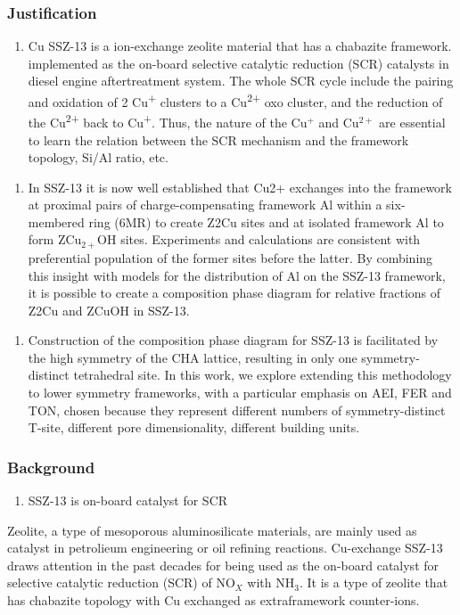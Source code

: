\documentclass[12pt]{article}
\begin{document}
\subsubsection*{Justification}
\begin{enumerate}
\item Cu SSZ-13 is a ion-exchange zeolite material that has a chabazite framework. implemented as the on-board selective catalytic reduction (SCR) catalysts in diesel engine aftertreatment system. The whole SCR cycle include the pairing and oxidation of 2 Cu\textsuperscript{+} clusters to a Cu\textsuperscript{2+} oxo cluster, and the reduction of the Cu\textsuperscript{2+} back to Cu\textsuperscript{+}. Thus, the nature of the Cu$^{+}$ and Cu$^{2+}$ are essential to learn the relation between the SCR mechanism and the framework topology, Si/Al ratio, etc.
\end{enumerate}

\begin{enumerate}
\item In SSZ-13 it is now well established that Cu2+ exchanges into the framework at proximal pairs of charge-compensating framework Al within a six-membered ring (6MR) to create Z2Cu sites and at isolated framework Al to form ZCu$_{2+}$OH sites.\cite{Paolucci2016}  Experiments and calculations are consistent with preferential population of the former sites before the latter. By combining this insight with models for the distribution of Al on the SSZ-13 framework, it is possible to create a composition phase diagram for relative fractions of Z2Cu and ZCuOH in SSZ-13.\cite{Paolucci2016}
\end{enumerate}

\begin{enumerate}
\item Construction of the composition phase diagram for SSZ-13 is facilitated by the high symmetry of the CHA lattice, resulting in only one symmetry-distinct tetrahedral site. In this work, we explore extending this  methodology to lower symmetry frameworks, with a particular emphasis on AEI, FER and TON, chosen because they represent different numbers of symmetry-distinct T-site, different pore dimensionality, different building units.
\end{enumerate}

\subsubsection*{Background}
\begin{enumerate}
\item SSZ-13 is on-board catalyst for SCR
\end{enumerate}
Zeolite, a type of mesoporous aluminosilicate materials, are mainly used as catalyst in petrolieum engineering or oil refining reactions. Cu-exchange SSZ-13 draws attention in the past decades for being used as the on-board catalyst for selective catalytic reduction (SCR) of NO$_{X}$ with NH$_{3}$.\cite{Paolucci2016,Paolucciscience,Paoluccichapter,Paolucci2014} It is a type of zeolite that has chabazite topology with Cu exchanged  as extraframework counter-ions.
 
\end{document}
